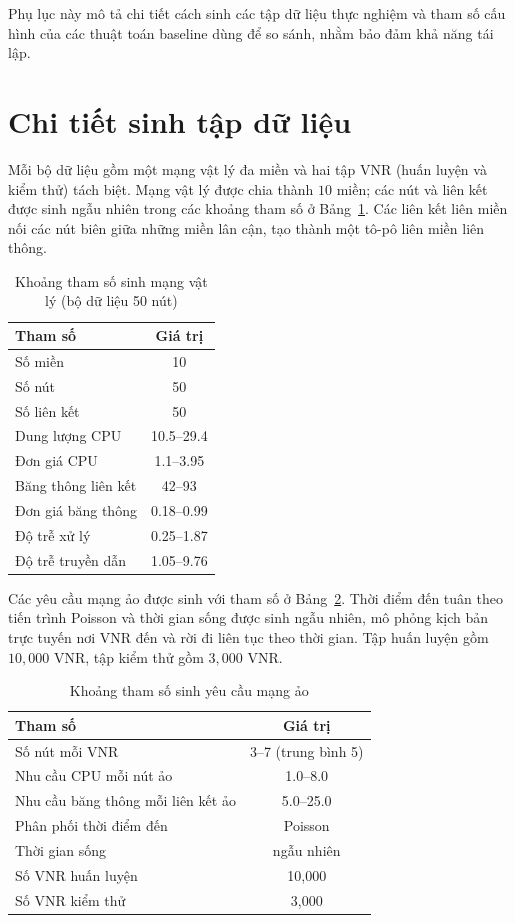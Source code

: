 \documentclass[../DoAn.tex]{subfiles}
\begin{document}
Phụ lục này mô tả chi tiết cách sinh các tập dữ liệu thực nghiệm và tham số cấu hình của các thuật toán baseline dùng để so sánh, nhằm bảo đảm khả năng tái lập.

\section{Chi tiết sinh tập dữ liệu}
\label{sec:app-data}

Mỗi bộ dữ liệu gồm một mạng vật lý đa miền và hai tập VNR (huấn luyện và kiểm thử) tách biệt. Mạng vật lý được chia thành $10$ miền; các nút và liên kết được sinh ngẫu nhiên trong các khoảng tham số ở Bảng~\ref{tab:app-substrate}. Các liên kết liên miền nối các nút biên giữa những miền lân cận, tạo thành một tô-pô liên miền liên thông.

\begin{table}[H]
\centering
\caption{Khoảng tham số sinh mạng vật lý (bộ dữ liệu 50 nút)}
\label{tab:app-substrate}
\begin{tabular}{lc}
\toprule
\textbf{Tham số} & \textbf{Giá trị} \\
\midrule
Số miền                & 10 \\
Số nút                 & 50 \\
Số liên kết            & 50 \\
Dung lượng CPU         & 10.5--29.4 \\
Đơn giá CPU            & 1.1--3.95 \\
Băng thông liên kết    & 42--93 \\
Đơn giá băng thông     & 0.18--0.99 \\
Độ trễ xử lý           & 0.25--1.87 \\
Độ trễ truyền dẫn      & 1.05--9.76 \\
\bottomrule
\end{tabular}
\end{table}

Các yêu cầu mạng ảo được sinh với tham số ở Bảng~\ref{tab:app-vnr}. Thời điểm đến tuân theo tiến trình Poisson và thời gian sống được sinh ngẫu nhiên, mô phỏng kịch bản trực tuyến nơi VNR đến và rời đi liên tục theo thời gian. Tập huấn luyện gồm $10{,}000$ VNR, tập kiểm thử gồm $3{,}000$ VNR.

\begin{table}[H]
\centering
\caption{Khoảng tham số sinh yêu cầu mạng ảo}
\label{tab:app-vnr}
\begin{tabular}{lc}
\toprule
\textbf{Tham số} & \textbf{Giá trị} \\
\midrule
Số nút mỗi VNR           & 3--7 (trung bình 5) \\
Nhu cầu CPU mỗi nút ảo   & 1.0--8.0 \\
Nhu cầu băng thông mỗi liên kết ảo & 5.0--25.0 \\
Phân phối thời điểm đến  & Poisson \\
Thời gian sống           & ngẫu nhiên \\
Số VNR huấn luyện        & 10{,}000 \\
Số VNR kiểm thử          & 3{,}000 \\
\bottomrule
\end{tabular}
\end{table}
\end{document}

